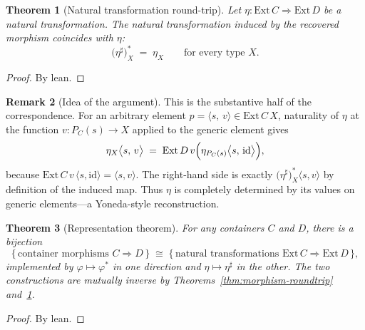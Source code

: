 \documentclass[11pt,a4paper]{article}
\theoremstyle{plain}
\newtheorem{theorem}{Theorem}[section]
\theoremstyle{definition}
\newtheorem{remark}[theorem]{Remark}
\newcommand{\Ext}{\mathrm{Ext}}
\newcommand{\id}{\mathrm{id}}
\begin{document}
\begin{theorem}[Natural transformation round-trip]\label{thm:nat-roundtrip}
Let $\eta : \Ext\,C \Longrightarrow \Ext\,D$ be a natural transformation.
The natural transformation induced by the recovered morphism coincides with
$\eta$:
\begin{equation}
  \bigl(\eta^\sharp\bigr)^*_X \;=\; \eta_X
  \qquad\text{for every type } X.
\end{equation}
\end{theorem}

\begin{proof}
By lean.
\end{proof}

\begin{remark}[Idea of the argument]
This is the substantive half of the correspondence. For an arbitrary element
$p = \langle s,\, v \rangle \in \Ext\,C\,X$, naturality of $\eta$ at the
function $v : P_C(s) \to X$ applied to the generic element gives
\begin{equation}
  \eta_X\bigl\langle s,\, v \bigr\rangle
  \;=\;
  \Ext\,D\,v\Bigl(
    \eta_{P_C(s)}\bigl\langle s,\, \id \bigr\rangle
  \Bigr),
\end{equation}
because $\Ext\,C\,v\,\langle s, \id \rangle = \langle s, v \rangle$. The
right-hand side is exactly $\bigl(\eta^\sharp\bigr)^*_X\langle s, v \rangle$
by definition of the induced map. Thus $\eta$ is completely determined by its
values on generic elements---a Yoneda-style reconstruction.
\end{remark}

\begin{theorem}[Representation theorem]\label{thm:representation}
For any containers $C$ and $D$, there is a bijection
\begin{equation}
  \bigl\{\,\text{container morphisms } C \Rightarrow D\,\bigr\}
  \;\cong\;
  \bigl\{\,\text{natural transformations }
    \Ext\,C \Longrightarrow \Ext\,D\,\bigr\},
\end{equation}
implemented by $\varphi \mapsto \varphi^*$ in one direction and
$\eta \mapsto \eta^\sharp$ in the other. The two constructions are mutually
inverse by Theorems~\ref{thm:morphism-roundtrip}
and~\ref{thm:nat-roundtrip}.
\end{theorem}

\begin{proof}
By lean.
\end{proof}

\end{document}
